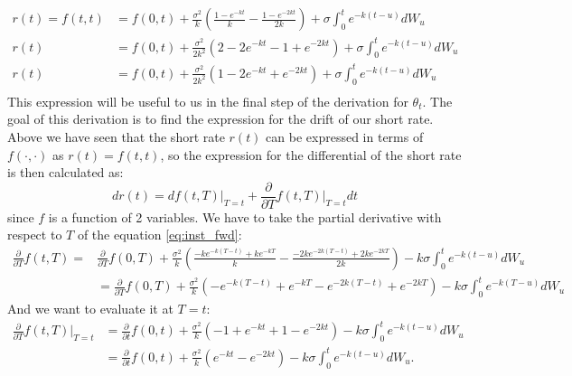 \documentclass[titlepage, 12pt]{article}
\begin{document}
	\begin{equation}\label{eq:rt_uselater}
		\begin{split}
			r(t) = f(t,t)& = f(0,t) + \frac{\sigma^2}{k} \left( \frac{1 - e^{-kt}}{k} - \frac{1 - e^{-2kt}}{2k} \right) + \sigma \int_0^t e^{-k(t-u)} dW_u \\
			r(t) &= f(0,t) + \frac{\sigma^2}{2k^2} \left( 2 - 2e^{-kt} - 1 + e^{-2kt} \right) + \sigma \int_0^t e^{-k(t-u)} dW_u \\
			r(t) &= f(0,t) + \frac{\sigma^2}{2k^2} \left( 1 - 2e^{-kt} + e^{-2kt} \right) + \sigma \int_0^t e^{-k(t-u)} dW_u \\
		\end{split}
	\end{equation}
	This expression will be useful to us in the final step of the derivation for $\theta_t$. The goal of this derivation is to find the expression for the drift of our short rate. Above we have seen that the short rate $r(t)$ can be expressed in terms of $f(\cdot,\cdot)$ as $r(t)=f(t,t)$, so the expression for the differential of the short rate is then calculated as:
	\begin{equation}
		dr(t) = df(t,T)\bigg|_{T=t} + \frac{\partial}{\partial T}f(t,T)\bigg|_{T=t}dt
	\end{equation}
	since $f$ is a function of 2 variables. We have to take the partial derivative with respect to $T$ of the equation \eqref{eq:inst_fwd}:
	\begin{equation}
		\begin{split}
			\frac{\partial}{\partial T}f(t,T) = &\frac{\partial}{\partial T}f(0,T) + \frac{\sigma^2}{k} \left( \frac{-ke^{-k(T-t)} + ke^{-kT}}{k} - \frac{-2ke^{-2k(T-t)} + 2k e^{-2kT}}{2k} \right) - k\sigma \int_0^t e^{-k(t-u)} dW_u \\
			&= \frac{\partial}{\partial T}f(0,T) + \frac{\sigma^2}{k} \left( -e^{-k(T-t)} + e^{-kT} - e^{-2k(T-t)} + e^{-2kT} \right) - k\sigma \int_0^t e^{-k(T-u)} dW_u
		\end{split}
	\end{equation}
	And we want to evaluate it at $T=t$:
	\begin{equation}\label{eq:dr_part1}
		\begin{split}
			\frac{\partial}{\partial T}f(t,T)\bigg|_{T=t} &= \frac{\partial}{\partial t}f(0,t) + \frac{\sigma^2}{k} \left( -1 + e^{-kt} + 1 - e^{-2kt} \right) - k\sigma \int_0^t e^{-k(t-u)} dW_u \\
			&= \frac{\partial}{\partial t}f(0,t) + \frac{\sigma^2}{k} \left( e^{-kt} - e^{-2kt} \right) - k\sigma \int_0^t e^{-k(t-u)} dW_u.
		\end{split}
	\end{equation}
\end{document}
